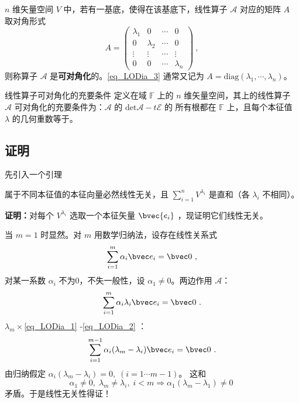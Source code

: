 \begin{definition}{}
 $n$ 维矢量空间 $V$ 中，若有一基底，使得在该基底下，线性算子 $\mathcal{A}$ 对应的矩阵 $A$ 取对角形式
 \begin{equation}\label{eq_LODia_3}
 A=\begin{pmatrix}
 \lambda_1&0&\cdots&0\\
 0&\lambda_2&\cdots&0\\
 \vdots&\vdots&\cdots&\vdots\\
 0&0&\cdots&\lambda_n
 \end{pmatrix}~,
 \end{equation}
 则称算子 $\mathcal{A}$ 是\textbf{可对角化}的。\autoref{eq_LODia_3} 通常又记为 $A=\mathrm{diag}(\lambda_1,\cdots,\lambda_n)$。
\end{definition}
\begin{theorem}{线性算子可对角化的充要条件}\label{the_LODia_1}
定义在域 $\mathbb{F}$ 上的 $n$ 维矢量空间，其上的线性算子 $\mathcal{A}$ 可对角化的充要条件为：$\mathcal{A}$ 的 $\mathrm{det}{\mathcal{A}-t \mathcal{E}}$ 的 所有根都在 $\mathbb{F}$ 上，且每个本征值 $\lambda$ 的几何重数等于。
\end{theorem}
\subsection{证明}
先引入一个引理
\begin{lemma}{}\label{lem_LODia_1}
属于不同本征值的本征向量必然线性无关，且 $\sum\limits_{i=1}^nV^{\lambda_i}$ 是直和（各 $\lambda_i$ 不相同）。
\end{lemma}
\textbf{证明：}对每个 $V^{\lambda_i}$ 选取一个本征矢量 $\bvec{e_i}$ ，现证明它们线性无关。

当 $m=1$ 时显然。对 $m$ 用数学归纳法，设存在线性关系式
\begin{equation}\label{eq_LODia_1}
\sum_{i=1}^{m}\alpha_i\bvec e_i=\bvec 0~,
\end{equation}
对某一系数 $\alpha_i$ 不为0，不失一般性，设 $\alpha_1\neq0$。两边作用 $\mathcal A$：
\begin{equation}\label{eq_LODia_2}
\sum_{i=1}^m\alpha_i\lambda_i\bvec e_i=\bvec 0~.
\end{equation}
$\lambda_m\times$\autoref{eq_LODia_1} -\autoref{eq_LODia_2} ：
\begin{equation}
\sum_{i=1}^{m-1}\alpha_i(\lambda_m-\lambda_i)\bvec e_i=\bvec 0~.
\end{equation}
由归纳假定 $\alpha_i(\lambda_m-\lambda_i)=0,\;(i=1\cdots m-1)$。 这和
\begin{equation}
\alpha_1\ne0,\;\lambda_m\neq\lambda_i,\;i<m\Rightarrow \alpha_1(\lambda
_m-\lambda_1)\neq0~
\end{equation}
矛盾。于是线性无关性得证！

